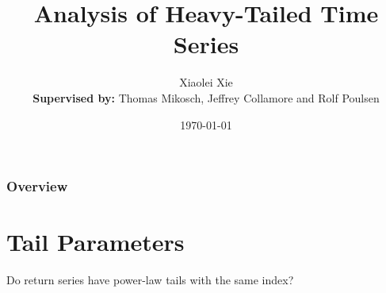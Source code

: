 \documentclass{beamer}
\title{Analysis of Heavy-Tailed Time Series}
\author{
  Xiaolei Xie\\
  \medskip
  {\scriptsize {\bf Supervised by:}  Thomas Mikosch, Jeffrey Collamore and  Rolf Poulsen}
} %
\institute[UCPH] %
{
University of Copenhagen \\ %
\medskip
\textit{xie@math.ku.dk} %
}
\date{\today} %
\begin{document}
\begin{frame}
\titlepage %
\end{frame}



\begin{frame}
\frametitle{Overview}
\tableofcontents
\end{frame}

\section{Tail Parameters}
\begin{frame}
  Do return series have power-law tails with the same index?
\end{frame}
\end{document}
